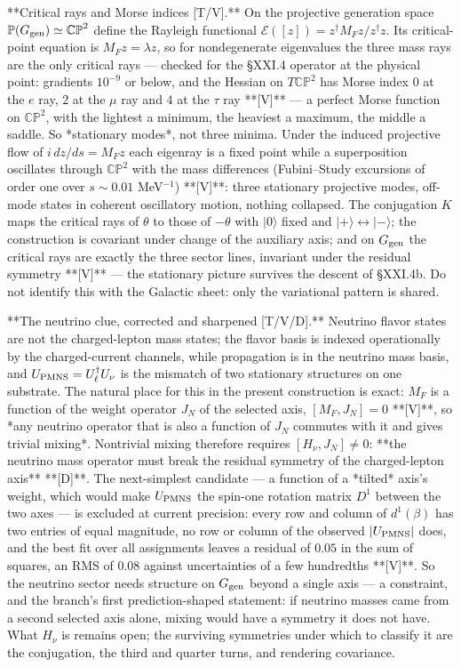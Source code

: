 **Critical rays and Morse indices [T/V].** On the projective generation space $\mathbb P(G_{\rm gen})\simeq\mathbb{CP}^2$ define the Rayleigh functional $\mathcal E([z]) = z^\dagger M_Fz/z^\dagger z$. Its critical-point equation is $M_Fz = \lambda z$, so for nondegenerate eigenvalues the three mass rays are the only critical rays — checked for the §XXI.4 operator at the physical point: gradients $10^{-9}$ or below, and the Hessian on $T\mathbb{CP}^2$ has Morse index $0$ at the $e$ ray, $2$ at the $\mu$ ray and $4$ at the $\tau$ ray **[V]** — a perfect Morse function on $\mathbb{CP}^2$, with the lightest a minimum, the heaviest a maximum, the middle a saddle. So *stationary modes*, not three minima. Under the induced projective flow of $i\,dz/ds = M_Fz$ each eigenray is a fixed point while a superposition oscillates through $\mathbb{CP}^2$ with the mass differences (Fubini–Study excursions of order one over $s\sim0.01$ MeV$^{-1}$) **[V]**: three stationary projective modes, off-mode states in coherent oscillatory motion, nothing collapsed. The conjugation $K$ maps the critical rays of $\theta$ to those of $-\theta$ with $|0\rangle$ fixed and $|+\rangle\leftrightarrow|-\rangle$; the construction is covariant under change of the auxiliary axis; and on $G_{\rm gen}$ the critical rays are exactly the three sector lines, invariant under the residual symmetry **[V]** — the stationary picture survives the descent of §XXI.4b. Do not identify this with the Galactic sheet: only the variational pattern is shared.

**The neutrino clue, corrected and sharpened [T/V/D].** Neutrino flavor states are not the charged-lepton mass states; the flavor basis is indexed operationally by the charged-current channels, while propagation is in the neutrino mass basis, and $U_{\rm PMNS} = U_\ell^\dagger U_\nu$ is the mismatch of two stationary structures on one substrate. The natural place for this in the present construction is exact: $M_F$ is a function of the weight operator $J_N$ of the selected axis, $[M_F,J_N] = 0$ **[V]**, so *any neutrino operator that is also a function of $J_N$ commutes with it and gives trivial mixing*. Nontrivial mixing therefore requires $[H_\nu,J_N]\neq0$: **the neutrino mass operator must break the residual symmetry of the charged-lepton axis** **[D]**. The next-simplest candidate — a function of a *tilted* axis's weight, which would make $U_{\rm PMNS}$ the spin-one rotation matrix $D^1$ between the two axes — is excluded at current precision: every row and column of $d^1(\beta)$ has two entries of equal magnitude, no row or column of the observed $|U_{\rm PMNS}|$ does, and the best fit over all assignments leaves a residual of $0.05$ in the sum of squares, an RMS of $0.08$ against uncertainties of a few hundredths **[V]**. So the neutrino sector needs structure on $G_{\rm gen}$ beyond a single axis — a constraint, and the branch's first prediction-shaped statement: if neutrino masses came from a second selected axis alone, mixing would have a symmetry it does not have. What $H_\nu$ is remains open; the surviving symmetries under which to classify it are the conjugation, the third and quarter turns, and rendering covariance.

